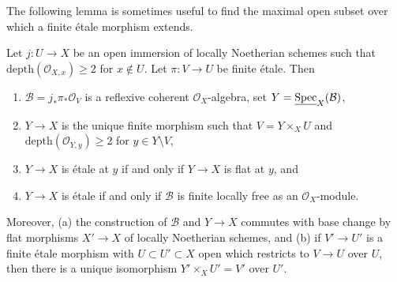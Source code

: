 \noindent
The following lemma is sometimes useful to find the maximal
open subset over which a finite \'etale morphism extends.

\begin{lemma}
\label{lemma-extend-S2}
Let $j : U \to X$ be an open immersion of locally Noetherian schemes
such that $\text{depth}(\mathcal{O}_{X, x}) \geq 2$ for $x \not \in U$.
Let $\pi : V \to U$ be finite \'etale. Then
\begin{enumerate}
\item $\mathcal{B} = j_*\pi_*\mathcal{O}_V$ is a reflexive coherent
$\mathcal{O}_X$-algebra, set $Y = \underline{\mathop{\mathrm{Spec}}}_X(\mathcal{B})$,
\item $Y \to X$ is the unique finite morphism such that
$V = Y \times_X U$ and $\text{depth}(\mathcal{O}_{Y, y}) \geq 2$
for $y \in Y \setminus V$,
\item $Y \to X$ is \'etale at $y$ if and only if $Y \to X$ is flat at $y$, and
\item $Y \to X$ is \'etale if and only if $\mathcal{B}$
is finite locally free as an $\mathcal{O}_X$-module.
\end{enumerate}
Moreover, (a) the construction of $\mathcal{B}$ and $Y \to X$ commutes
with base change by flat morphisms $X' \to X$ of locally Noetherian
schemes, and (b) if $V' \to U'$ is a finite \'etale morphism with
$U \subset U' \subset X$ open which restricts to $V \to U$ over $U$,
then there is a unique isomorphism $Y' \times_X U' = V'$ over $U'$.
\end{lemma}

